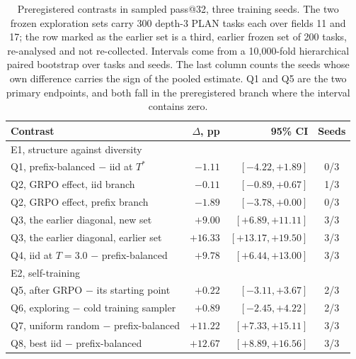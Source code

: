 \begin{table}[!tbh]
\centering\scriptsize\setlength{\tabcolsep}{4pt}
\begin{tabular}{|l|r|r|c|}
\hline
\textbf{Contrast} & \textbf{$\Delta$, pp} & \textbf{95\% CI} & \textbf{Seeds} \\
\hline
\multicolumn{4}{|l|}{E1, structure against diversity} \\ \hline
Q1, prefix-balanced $-$ iid at $T^{*}$ & $-1.11$ & $[-4.22, +1.89]$ & 0/3 \\ \hline
Q2, GRPO effect, iid branch & $-0.11$ & $[-0.89, +0.67]$ & 1/3 \\ \hline
Q2, GRPO effect, prefix branch & $-1.89$ & $[-3.78, +0.00]$ & 0/3 \\ \hline
Q3, the earlier diagonal, new set & $+9.00$ & $[+6.89, +11.11]$ & 3/3 \\ \hline
Q3, the earlier diagonal, earlier set & $+16.33$ & $[+13.17, +19.50]$ & 3/3 \\ \hline
Q4, iid at $T=3.0$ $-$ prefix-balanced & $+9.78$ & $[+6.44, +13.00]$ & 3/3 \\ \hline
\multicolumn{4}{|l|}{E2, self-training} \\ \hline
Q5, after GRPO $-$ its starting point & $+0.22$ & $[-3.11, +3.67]$ & 2/3 \\ \hline
Q6, exploring $-$ cold training sampler & $+0.89$ & $[-2.45, +4.22]$ & 2/3 \\ \hline
Q7, uniform random $-$ prefix-balanced & $+11.22$ & $[+7.33, +15.11]$ & 3/3 \\ \hline
Q8, best iid $-$ prefix-balanced & $+12.67$ & $[+8.89, +16.56]$ & 3/3 \\ \hline
\end{tabular}
\caption{Preregistered contrasts in sampled pass@32, three training seeds. The two
frozen exploration sets carry 300 depth-3 PLAN tasks each over fields 11 and 17; the
row marked as the earlier set is a third, earlier frozen set of 200 tasks, re-analysed
and not re-collected.
Intervals come from a 10{,}000-fold hierarchical paired bootstrap over tasks and
seeds. The last column counts the seeds whose own difference carries the sign of
the pooled estimate. Q1 and Q5 are the two primary endpoints, and both fall in the
preregistered branch where the interval contains zero.}
\label{tab:exploration}
\end{table}
